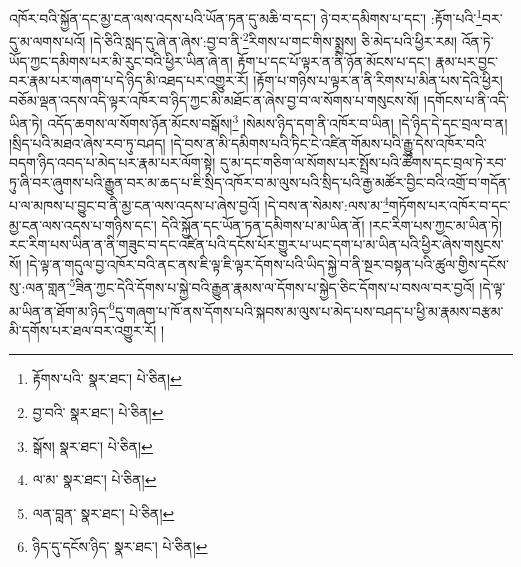 འཁོར་བའི་སྐྱོན་དང་མྱ་ངན་ལས་འདས་པའི་ཡོན་ཏན་དུ་མཆི་བ་དང་། ཉེ་བར་དམིགས་པ་དང་། :རྟོག་པའི་\footnote{རྟོགས་པའི་  སྣར་ཐང་།  པེ་ཅིན། }བར་དུ་མ་ལགས་པའོ། །དེ་ཅིའི་སླད་དུ་ཞེ་ན་ཞེས་:བྱ་བ་ནི་\footnote{བྱ་བའི་  སྣར་ཐང་།  པེ་ཅིན། }རིགས་པ་གང་གིས་སྨྲས། ཅི་མེད་པའི་ཕྱིར་རམ། འོན་ཏེ་ཡོད་ཀྱང་དམིགས་པར་མི་རུང་བའི་ཕྱིར་ཡིན་ཞེ་ན། རྟོག་པ་དང་པོ་ལྟར་ན་ནི་ཉོན་མོངས་པ་དང་། རྣམ་པར་བྱང་བར་རྣམ་པར་གཞག་པ་དེ་ཉིད་མི་འཐད་པར་འགྱུར་རོ། །རྟོག་པ་གཉིས་པ་ལྟར་ན་ནི་རིགས་པ་མིན་པས་དེའི་ཕྱིར། བཅོམ་ལྡན་འདས་འདི་ལྟར་འཁོར་བ་ཉིད་ཀྱང་མི་མཐོང་ན་ཞེས་བྱ་བ་ལ་སོགས་པ་གསུངས་སོ། །དགོངས་པ་ནི་འདི་ཡིན་ཏེ། འདོད་ཆགས་ལ་སོགས་ཉོན་མོངས་བསྒོས།\footnote{སྒོས།  སྣར་ཐང་།  པེ་ཅིན། } །སེམས་ཉིད་དག་ནི་འཁོར་བ་ཡིན། །དེ་ཉིད་དེ་དང་བྲལ་བ་ན། །སྲིད་པའི་མཐའ་ཞེས་རབ་ཏུ་བཤད། །དེ་བས་ན་མི་དམིགས་པའི་ཏིང་ངེ་འཛིན་གོམས་པའི་རྒྱུ་དེས་འཁོར་བའི་བདག་ཉིད་འབད་པ་མེད་པར་རྣམ་པར་ལོག་སྟེ། དུ་མ་དང་གཅིག་ལ་སོགས་པར་སྤྲོས་པའི་ཚོགས་དང་བྲལ་ཏེ་རབ་ཏུ་ཞི་བར་ཞུགས་པའི་རྒྱུན་བར་མ་ཆད་པ་ཇི་སྲིད་འཁོར་བ་མ་ལུས་པའི་སྲིད་པའི་རྒྱ་མཚོར་བྱིང་བའི་འགྲོ་བ་གདོན་པ་ལ་མཁས་པ་བྱུང་བ་ནི་མྱ་ངན་ལས་འདས་པ་ཞེས་བྱའོ། །དེ་བས་ན་སེམས་:ལས་མ་\footnote{ལ་མ་  སྣར་ཐང་།  པེ་ཅིན། }གཏོགས་པར་འཁོར་བ་དང་མྱ་ངན་ལས་འདས་པ་གཉིས་དང་། དེའི་སྐྱོན་དང་ཡོན་ཏན་དམིགས་པ་མ་ཡིན་ནོ། །རང་རིག་པས་ཀྱང་མ་ཡིན་ཏེ། རང་རིག་པས་ཡིན་ན་ནི་གཟུང་བ་དང་འཛིན་པའི་དངོས་པོར་གྱུར་པ་ཡང་དག་པ་མ་ཡིན་པའི་ཕྱིར་ཞེས་གསུངས་སོ། །དེ་ལྟ་ན་གདུལ་བྱ་འཁོར་བའི་ནང་ནས་ཇི་ལྟ་ཇི་ལྟར་དོགས་པའི་ཡིད་སྐྱེ་བ་ནི་སྔར་བསྟན་པའི་ཚུལ་གྱིས་དངོས་སུ་:ལན་གླན་\footnote{ལན་བླན་  སྣར་ཐང་།  པེ་ཅིན། }ཟིན་ཀྱང་དེའི་དོགས་པ་སྐྱེ་བའི་རྒྱུན་རྣམས་ལ་དོགས་པ་སྐྱེད་ཅིང་དོགས་པ་བསལ་བར་བྱའོ། །དེ་ལྟ་མ་ཡིན་ན་ཐོག་མ་ཉིད་\footnote{ཉིད་དུ་དངོས་ཉིད་  སྣར་ཐང་།  པེ་ཅིན། }དུ་གཞག་པ་ཁོ་ནས་དོགས་པའི་སྐབས་མ་ལུས་པ་མེད་པས་བཤད་པ་ཕྱི་མ་རྣམས་བརྩམ་མི་དགོས་པར་ཐལ་བར་འགྱུར་རོ། །
